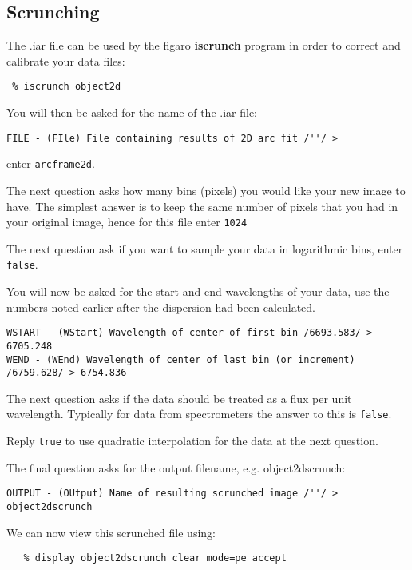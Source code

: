 \documentclass[twoside,11pt]{article}
\newcommand{\xref}[3]{#1}
\newcommand{\scspec}[2]{#1}
\newcommand{\scspec}[2]{#2}
\begin{document}
\subsection{Scrunching}

The .iar file can be used by the \xref{{\sc figaro}}{sun86}{}
\xref{{\bf iscrunch}}{sun86}{ISCRUNCH} program in order to correct
and calibrate your data files:

{\scspec{\small}{ }
\begin{verbatim}
 % iscrunch object2d
\end{verbatim}
}
You will then be asked for the name of the .iar file:
{\scspec{\small}{ }
\begin{verbatim}
FILE - (FIle) File containing results of 2D arc fit /''/ >
\end{verbatim}
}enter {\tt arcframe2d}.

The next question asks how many bins (pixels) you would like your new
image to have. The simplest answer is to keep the same number of
pixels that you had in your original image, hence for this file enter
{\tt 1024}

The next question ask if you want to sample your data in logarithmic
bins, enter {\tt false}.

You will now be asked for the start and end wavelengths of your data,
use the numbers noted earlier after the dispersion had been
calculated.
{
\scspec{\small}{ }
\begin{verbatim}
WSTART - (WStart) Wavelength of center of first bin /6693.583/ > 6705.248
WEND - (WEnd) Wavelength of center of last bin (or increment) /6759.628/ > 6754.836
\end{verbatim}
}

The next question asks if the data should be treated as a flux per
unit wavelength. Typically for data from spectrometers the answer to
this is {\tt false}.

Reply {\tt true} to use quadratic interpolation for the data at the next question.

The final question asks for the output filename, e.g. object2dscrunch:
{\scspec{\small}{ }
\begin{verbatim}
OUTPUT - (OUtput) Name of resulting scrunched image /''/ > object2dscrunch
\end{verbatim}
}

We can now view this scrunched file using:

{\scspec{\small}{ }
\begin{verbatim}
   % display object2dscrunch clear mode=pe accept
\end{verbatim}
}
\end{document}
